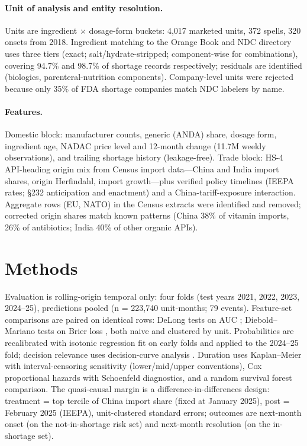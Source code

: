 \documentclass[11pt]{article}
\begin{document}
\paragraph{Unit of analysis and entity resolution.} Units are ingredient $\times$ dosage-form buckets: 4{,}017 marketed units, 372 spells, 320 onsets from 2018. Ingredient matching to the Orange Book and NDC directory uses three tiers (exact; salt/hydrate-stripped; component-wise for combinations), covering 94.7\% and 98.7\% of shortage records respectively; residuals are identified (biologics, parenteral-nutrition components). Company-level units were rejected because only 35\% of FDA shortage companies match NDC labelers by name.

\paragraph{Features.} Domestic block: manufacturer counts, generic (ANDA) share, dosage form, ingredient age, NADAC price level and 12-month change (11.7M weekly observations), and trailing shortage history (leakage-free). Trade block: HS-4 API-heading origin mix from Census import data---China and India import shares, origin Herfindahl, import growth---plus verified policy timelines (IEEPA rates; \S232 anticipation and enactment) and a China-tariff-exposure interaction. Aggregate rows (EU, NATO) in the Census extracts were identified and removed; corrected origin shares match known patterns (China 38\% of vitamin imports, 26\% of antibiotics; India 40\% of other organic APIs).

\section{Methods}
Evaluation is rolling-origin temporal only: four folds (test years 2021, 2022, 2023, 2024--25), predictions pooled (n = 223{,}740 unit-months; 79 events). Feature-set comparisons are paired on identical rows: DeLong tests on AUC \citep{delong1988}; Diebold--Mariano tests on Brier loss \citep{diebold1995}, both naive and clustered by unit. Probabilities are recalibrated with isotonic regression fit on early folds and applied to the 2024--25 fold; decision relevance uses decision-curve analysis \citep{vickers2006}. Duration uses Kaplan--Meier with interval-censoring sensitivity (lower/mid/upper conventions), Cox proportional hazards with Schoenfeld diagnostics, and a random survival forest comparison. The quasi-causal margin is a difference-in-differences design: treatment = top tercile of China import share (fixed at January 2025), post = February 2025 (IEEPA), unit-clustered standard errors; outcomes are next-month onset (on the not-in-shortage risk set) and next-month resolution (on the in-shortage set).
\end{document}
